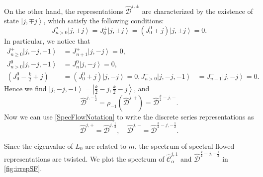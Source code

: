 \documentclass[10pt,a4paper]{article}
\numberwithin{equation}{section}
\newcommand{\ket}[1]{\left| #1 \right\rangle}
\begin{document}
On the other hand, the representations $\hat{\mathcal{D}}^{j,\pm}$ are characterized by the existence of state $\ket{j,\mp j}$, 
which satisfy the following conditions:
\begin{equation}
    J^{a}_{n>0} \ket{j,\pm j} = J^{\pm}_{0} \ket{j,\pm j} = (J^{0}_{0} \mp j) \ket{j,\pm j} =0.
\end{equation}
In particular, we notice that 
\begin{equation}
    \begin{aligned}
        J^{+}_{n \geq 0} \ket{j,-j,-1} &= J^{+}_{n+1} \ket{j,-j}  = 0, \\
        J^{0}_{n > 0} \ket{j,-j,-1} & =  J^{0}_{n}\ket{j,-j} = 0,\\
        \left(J^{0}_{0} - \frac{k}{2} +j \right) & = \left( J^{0}_{0} + j \right) \ket{j,-j} = 0,
        J^{-}_{n>0} \ket{j,-j,-1} &= J^{-}_{n-1} \ket{j,-j}   =  0.
    \end{aligned}
\end{equation}
Hence we find $\ket{j,-j,-1} = \ket{\frac{k}{2}-j, \frac{k}{2}-j}$, and 
\begin{equation}
    \hat{\mathcal{D}}^{j,-\frac{1}{2}} = \rho_{-1} \left( \hat{\mathcal{D}}^{j,+} \right) = \hat{\mathcal{D}}^{\frac{k}{2}-j,-}.
\end{equation}
Now we can use \eqref{SpecFlowNotation} to write the discrete series representations as 
\begin{equation}
    \widehat{\mathcal{D}}^{j,+} = \widehat{\mathcal{D}}^{j,\frac{1}{2}},\quad \widehat{\mathcal{D}}^{j,-} = \widehat{\mathcal{D}}^{\frac{k}{2}-j,-\frac{1}{2}}.
\end{equation}

Since the eigenvalue of $L_{0}$ are related to $m$, the spectrum of spectral flowed representations 
are twisted. We plot the spectrum of $\widehat{\mathcal{C}}^{j,1}_{\alpha}$ and $\widehat{\mathcal{D}}^{\frac{k}{2}-j, -\frac{1}{2}}$ 
in \ref{fig:irrepSF}.
\end{document}
